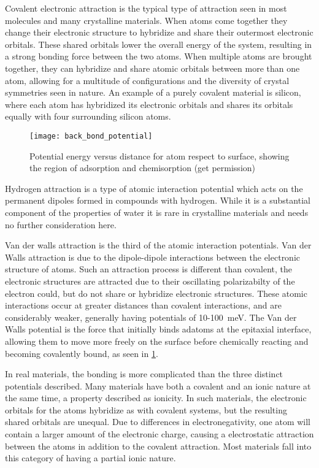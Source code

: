 Covalent electronic attraction is the typical type of attraction seen in most molecules and many crystalline materials. When atoms come together they change their electronic structure to hybridize and share their outermost electronic orbitals. These shared orbitals lower the overall energy of the system, resulting in a strong bonding force between the two atoms. When multiple atoms are brought together, they can hybridize and share atomic orbitals between more than one atom, allowing for a multitude of configurations and the diversity of crystal symmetries seen in nature. An example of a purely covalent material is silicon, where each atom has hybridized its electronic orbitals and shares its orbitals equally with four surrounding silicon atoms.
\begin{figure}
    \centering
    \texttt{[image: back\_bond\_potential]}
    \caption[Energy potentials between two atoms]{\label{fig:back_bond_potential}Potential energy versus distance for atom respect to surface, showing the region of adsorption and chemisorption\cite{ohring2001materials} (get permission)}
\end{figure}

Hydrogen attraction is a type of atomic interaction potential which acts on the permanent dipoles formed in compounds with hydrogen. While it is a substantial component of the properties of water it is rare in crystalline materials and needs no further consideration here.

Van der walls attraction is the third of the atomic interaction potentials. Van der Walls attraction is due to the dipole-dipole interactions between the electronic structure of atoms. Such an attraction process is different than covalent, the electronic structures are attracted due to their oscillating polarizabilty of the electron could, but do not share or hybridize electronic structures. These atomic interactions occur at greater distances than covalent interactions, and are considerably weaker, generally having potentials of 10-100~meV. The Van der Walls potential is the force that initially binds adatoms at the epitaxial interface, allowing them to move more freely on the surface before chemically reacting and becoming covalently bound, as seen in \cref{fig:back_bond_potential}.

In real materials, the bonding is more complicated than the three distinct potentials described. Many materials have both a covalent and an ionic nature at the same time, a property described as ionicity. In such materials, the electronic orbitals for the atoms hybridize as with covalent systems, but the resulting shared orbitals are unequal. Due to differences in electronegativity, one atom will contain a larger amount of the electronic charge, causing a electrostatic attraction between the atoms in addition to the covalent attraction. Most materials fall into this category of having a partial ionic nature.


